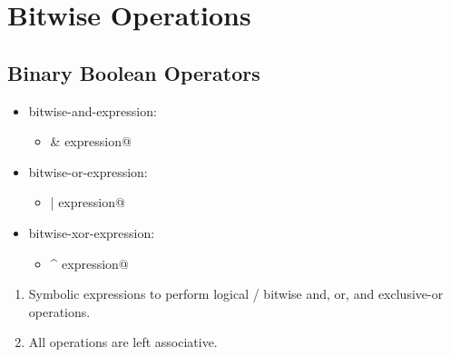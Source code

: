 \section{Bitwise Operations}

\subsection{Binary Boolean Operators}
\begin{itemize}[before=\itshape, label={}]
	\item bitwise-and-expression:
	\begin{itemize}[before=\itshape, label={}]
		\item \lstinline@expression & expression@
	\end{itemize}
	\item bitwise-or-expression:
	\begin{itemize}[before=\itshape, label={}]
		\item \lstinline@expression | expression@
	\end{itemize}
	\item bitwise-xor-expression:
	\begin{itemize}[before=\itshape, label={}]
		\item \lstinline@expression ^ expression@
	\end{itemize}
\end{itemize}
\begin{enumerate}
	\item Symbolic expressions to perform logical / bitwise and, or, and exclusive-or operations.
	\item All operations are left associative.
\end{enumerate}
